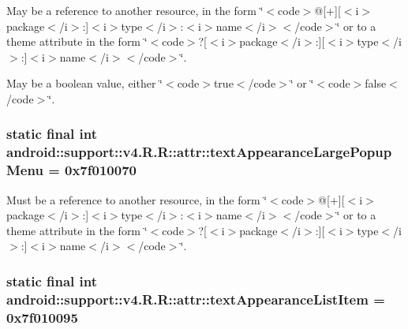 May be a reference to another resource, in the form \char`\"{}$<$code$>$@\mbox{[}+\mbox{]}\mbox{[}$<$i$>$package$<$/i$>$:\mbox{]}$<$i$>$type$<$/i$>$:$<$i$>$name$<$/i$>$$<$/code$>$\char`\"{} or to a theme attribute in the form \char`\"{}$<$code$>$?\mbox{[}$<$i$>$package$<$/i$>$:\mbox{]}\mbox{[}$<$i$>$type$<$/i$>$:\mbox{]}$<$i$>$name$<$/i$>$$<$/code$>$\char`\"{}. 

May be a boolean value, either \char`\"{}$<$code$>$true$<$/code$>$\char`\"{} or \char`\"{}$<$code$>$false$<$/code$>$\char`\"{}. \hypertarget{classandroid_1_1support_1_1v4_1_1_r_1_1attr_22a775eef7aa27f448bf3812b1c19363}{
\subsubsection[{textAppearanceLargePopupMenu}]{\setlength{\rightskip}{0pt plus 5cm}static final int android::support::v4.R.R::attr::textAppearanceLargePopupMenu = 0x7f010070}}
\label{classandroid_1_1support_1_1v4_1_1_r_1_1attr_22a775eef7aa27f448bf3812b1c19363}


Must be a reference to another resource, in the form \char`\"{}$<$code$>$@\mbox{[}+\mbox{]}\mbox{[}$<$i$>$package$<$/i$>$:\mbox{]}$<$i$>$type$<$/i$>$:$<$i$>$name$<$/i$>$$<$/code$>$\char`\"{} or to a theme attribute in the form \char`\"{}$<$code$>$?\mbox{[}$<$i$>$package$<$/i$>$:\mbox{]}\mbox{[}$<$i$>$type$<$/i$>$:\mbox{]}$<$i$>$name$<$/i$>$$<$/code$>$\char`\"{}. \hypertarget{classandroid_1_1support_1_1v4_1_1_r_1_1attr_5387aabe03b6f474b4aa90cc0f58fdae}{
\subsubsection[{textAppearanceListItem}]{\setlength{\rightskip}{0pt plus 5cm}static final int android::support::v4.R.R::attr::textAppearanceListItem = 0x7f010095}}
\label{classandroid_1_1support_1_1v4_1_1_r_1_1attr_5387aabe03b6f474b4aa90cc0f58fdae}


